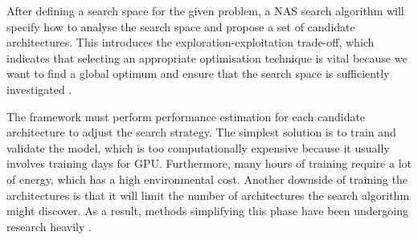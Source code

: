 After defining a search space for the given problem, a \gls{NAS} search algorithm will specify how to analyse the search space and propose a set of candidate architectures. This introduces the exploration-exploitation trade-off, which indicates that selecting an appropriate optimisation technique is vital because we want to find a global optimum and ensure that the search space is sufficiently investigated \autocite{kyriakides2020introduction}. 

The framework must perform performance estimation for each candidate architecture to adjust the search strategy. The simplest solution is to train and validate the model, which is too computationally expensive because it usually involves training days for \gls{GPU}. Furthermore, many hours of training require a lot of energy, which has a high environmental cost. Another downside of training the architectures is that it will limit the number of architectures the search algorithm might discover. As a result, methods simplifying this phase have been undergoing research heavily \autocite{elsken2019neural}. 





